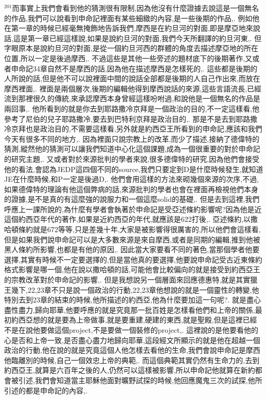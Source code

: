 \documentclass{book}
\begin{document}
$^{201}$而事實上我們會看到他的猜測很有限制,因為他沒有什麼證據去說這是一個無名的作品,我們可以說看到申命記裡面有某些細緻的內容,是一些後期的作品,.
例如他在第一章的時候已經毫無掩飾地告訴我們,摩西是在約旦河的對面,即是摩亞地來說話,這是第一章已經這樣說,如果是說約旦河的對面,我們今天所翻譯的約旦河東,.
但字眼原本是說約旦河的對面,是從一個約旦河西的群體的角度去描述摩亞地的所在位置,所以一定是後過摩西,.
不過這些是其他一些旁述的題材底下的後期著作,又或者申命記34章自然不是摩西的話,因為他在描述摩西是怎樣死的,.
這些都是後期的人所說的話,但是他不可以說裡面中間的說話全部都是後期的人自己作出來,而放在摩西裡面,.
裡面是兩個層次,後期的編輯他得到摩西說話的來源,這些言語流長,已經流到那裡很久的傳統,來承認摩西本身曾經這樣吩咐過,和說他是一個無名的作品是兩回事,.
他所看到的就是你去到耶路撒冷京拜是一個政治的目的,不一定這樣看,他參考了尼伯的兒子耶路撒冷,要去到巴特利京拜是政治目的,.
那是不是去到耶路撒冷京拜也是政治目的,不需要這樣看,另外就是約西亞王所看到的申命記,應該和我們今天有很多不同的地方,.
因為裡面只說宗教上的改革,而少了描述,接納了德偉特的猜測,縱然他的猜測可以讓我們知道中心化這個課題,成為一個很重要的對於申命記的研究主題,.
又或者對於來源批判的學者來說,很多德偉特的研究,因為他們會接受他的看法,會認為JEDP這四個不同的source,我們只要定到D是什麼時候發生,就知道JE在什麼時候,和P一定是後過D,.
他們會用這樣的方法來砌幾個來源的次序,不過,如果德偉特的理論有他這個弊病的話,來源批判的學者也會在裡面再檢視他們本身的證據,是不是真的有這麼強的說服力和一個這麼solid的基礎,.
但是去到這裡,我們呼應上一課所說的,為什麼有學者會執著於申命記是受亞述條約影響呢?因為他是近這個約西亞年代的著作,如果是近約西亞的年代,就應該是622打後,.
亞述條約,以撒哈頓條約就是672等等,只是差幾十年,大家是被影響得很厲害的,所以他們會這樣看,但是如果我們說申命記可以是大多數來源是來自摩西,或者是同期的編輯,推到他被黑人條約所影響,也都是有他的原因,.
因此當大家要看不同的著色,當那個學者他要選擇,其實有時候不一定要選擇的,但是當他真的要選擇,他要說申命記受古近東條約格式影響是哪一個,他在說以撒哈頓的話,可能他會比較偏向的就是接受到約西亞王的宗教改革對於申命記的影響,.
但是我想說另一個層面來回應德惠特,就是其實獵王幾下,22,23章不只是說一個政治的行動,22,23章他想說的就是一個靈性的轉變,他特別去到23章的結束的時候,他所描述的約西亞,他為什麼要加這一句呢?.
就是盡心盡性盡力,歸向耶華,他要呼應的就是究竟那一批百姓是怎樣看他們和上帝的關係,最初約西亞想的就是要為上帝做事,就是要重建,硬建的東西,就是聖殿,但是這裡已經不是在說他要做這個project,不是要做一個裝修的project,.
這裡說的是他要看他的心是否和上帝一致,是否盡心盡力地歸向耶華,這段經文所顯示的就是他在超越一個政治的行動,他在說的就是究竟這個人他怎樣去看他的生命,我們會說申命記是摩西他臨離別的時候,自己一個效忠上帝的典範,.
而這個典範其實仍然有生命力的,去到約西亞王,就算是六百年之後的人,仍然可以這樣被影響,所以申命記他就算在新約都會被引述,我們會知道當主耶穌他面對曠野試探的時候,他回應魔鬼三次的試探,他所引述的都是申命記的內容,.
\end{document}
